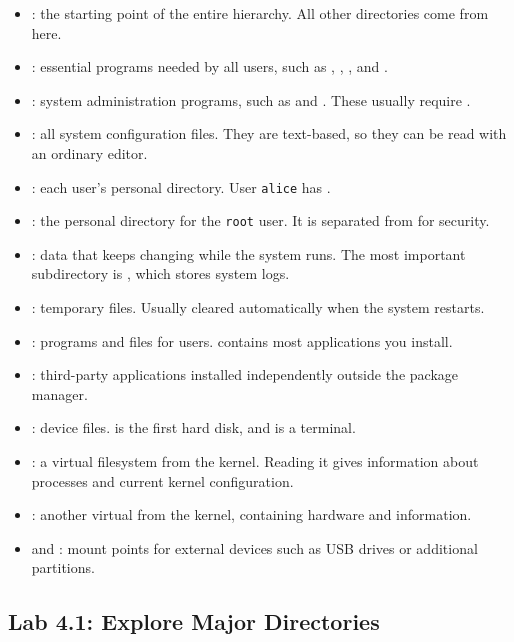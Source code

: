 \begin{itemize}
    \item \dir{/} : the starting point of the entire hierarchy. All other directories come from here.
    \item {} : essential programs needed by all users, such as , , , and .
    \item {} : system administration programs, such as  and . These usually require .
    \item {} : all system configuration files. They are text-based, so they can be read with an ordinary editor.
    \item {} : each user's personal directory. User \texttt{alice} has .
    \item {} : the personal directory for the \texttt{root} user. It is separated from  for security.
    \item {} : data that keeps changing while the system runs. The most important subdirectory is , which stores system logs.
    \item {} : temporary files. Usually cleared automatically when the system restarts.
    \item {} : programs and  files for users.  contains most applications you install.
    \item {} : third-party applications installed independently outside the package manager.
    \item {} : device files.  is the first hard disk, and  is a terminal.
    \item {} : a virtual filesystem from the kernel. Reading it gives information about processes and current kernel configuration.
    \item {} : another virtual  from the kernel, containing hardware and  information.
    \item {} and  : mount points for external devices such as USB drives or additional partitions.
\end{itemize}

\subsection*{Lab 4.1: Explore Major Directories}

